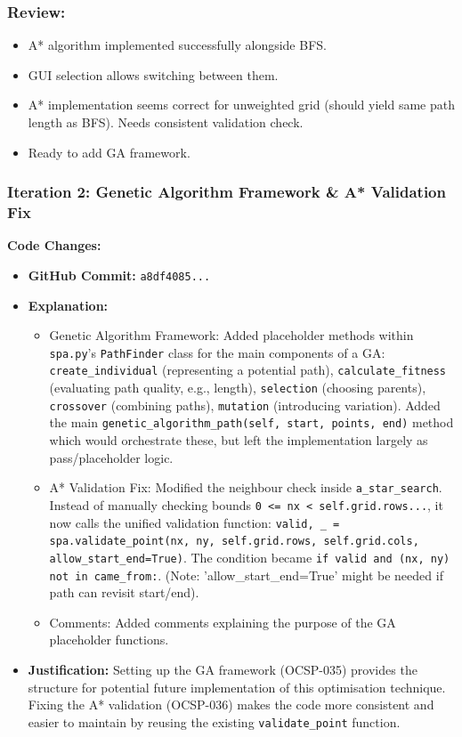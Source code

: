 \subsubsection{Review:}
\begin{itemize}
	\item A* algorithm implemented successfully alongside BFS.
	\item GUI selection allows switching between them.
	\item A* implementation seems correct for unweighted grid (should yield same path length as BFS). Needs consistent validation check.
	\item Ready to add GA framework.
\end{itemize}

\newpage

\subsubsection{Iteration 2: Genetic Algorithm Framework \& A* Validation Fix}

\textbf{Code Changes:}
\begin{itemize}
	\item \textbf{GitHub Commit:} \verb|a8df4085...|
	\item \textbf{Explanation:}
	\begin{itemize}
		\item Genetic Algorithm Framework: Added placeholder methods within \verb|spa.py|'s \verb|PathFinder| class for the main components of a GA: \verb|create_individual| (representing a potential path), \verb|calculate_fitness| (evaluating path quality, e.g., length), \verb|selection| (choosing parents), \verb|crossover| (combining paths), \verb|mutation| (introducing variation). Added the main \verb|genetic_algorithm_path(self, start, points, end)| method which would orchestrate these, but left the implementation largely as pass/placeholder logic.
		\item A* Validation Fix: Modified the neighbour check inside \verb|a_star_search|. Instead of manually checking bounds \verb|0 <= nx < self.grid.rows...|, it now calls the unified validation function: \verb|valid, _ = spa.validate_point(nx, ny, self.grid.rows, self.grid.cols, allow_start_end=True)|. The condition became \verb|if valid and (nx, ny) not in came_from:|. (Note: 'allow_start_end=True' might be needed if path can revisit start/end).
		\item Comments: Added comments explaining the purpose of the GA placeholder functions.
	\end{itemize}
	\item \textbf{Justification:} Setting up the GA framework (OCSP-035) provides the structure for potential future implementation of this optimisation technique. Fixing the A* validation (OCSP-036) makes the code more consistent and easier to maintain by reusing the existing \verb|validate_point| function.
\end{itemize}

